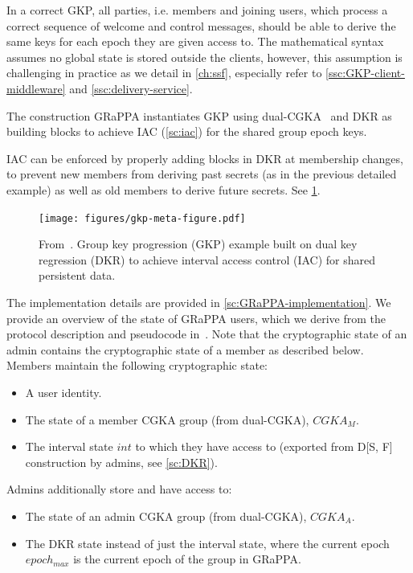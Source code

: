 In a correct GKP, all parties, i.e. members and joining users, which process a correct
sequence of welcome and control messages, should be able to derive the same keys
for each epoch they are given access to. The mathematical syntax assumes
no global state is stored outside the clients, however, this assumption is challenging
in practice as we detail in \cref{ch:ssf},
especially refer to \cref{ssc:GKP-client-middleware} and \cref{ssc:delivery-service}.

The construction GRaPPA instantiates GKP using dual-CGKA~\cite{USENIX:BalColVau23}
and DKR \cite{GKP} as building blocks to achieve IAC (\cref{sc:iac}) for the shared group epoch keys.

IAC can be enforced by properly adding blocks in DKR at membership
changes, to prevent new members from deriving past secrets (as in the previous detailed example)
as well as old members to derive future secrets. See \cref{fig:gkp-iac}.

\begin{figure}[t]
	\centering
	\texttt{[image: figures/gkp-meta-figure.pdf]}
	\caption{
        From~\cite{GKP}.
        Group key progression (GKP) example built on dual key regression (DKR) to achieve interval access control
        (IAC) for shared persistent data.
        \label{fig:gkp-iac}}
\end{figure}

The implementation details are provided in \cref{sc:GRaPPA-implementation}.
We provide an overview of the state of GRaPPA users, which we derive from the protocol description and pseudocode in~\cite{GKP}. 
Note that the cryptographic state of an admin contains the cryptographic state of a member as described below.
Members maintain the following cryptographic state:
\begin{itemize}
    \item A user identity.
    \item The state of a member CGKA group (from dual-CGKA), $CGKA_M$.
    \item The interval state $int$ to which they have access to (exported from D[S, F] construction by admins, see \cref{sc:DKR}).
\end{itemize}
Admins additionally store and have access to:
\begin{itemize}
    \item The state of an admin CGKA group (from dual-CGKA), $CGKA_A$.
    \item The DKR state instead of just the interval state, where the current epoch $epoch_{max}$ is the current epoch of the group in GRaPPA.
\end{itemize}


